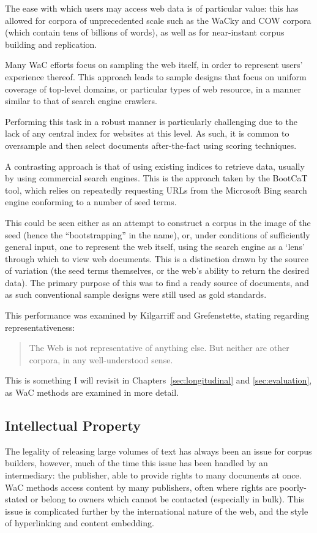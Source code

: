 The ease with which users may access web data is of particular value: this has allowed for corpora of unprecedented scale such as the WaCky\cite{baroni2009wacky} and COW\cite{schafer2012building} corpora (which contain tens of billions of words), as well as for near-instant corpus building and replication.

Many WaC efforts focus on sampling the web itself, in order to represent users' experience thereof.  This approach leads to sample designs that focus on uniform coverage of top-level domains, or particular types of web resource, in a manner similar to that of search engine crawlers.

Performing this task in a robust manner is particularly challenging due to the lack of any central index for websites at this level.  As such, it is common to oversample and then select documents after-the-fact using scoring techniques\cite{schafer2013web,schafer2014focused}.

A contrasting approach is that of using existing indices to retrieve data, usually by using commercial search engines.  This is the approach taken by the BootCaT tool, which relies on repeatedly requesting URLs from the Microsoft Bing search engine conforming to a number of seed terms.

This could be seen either as an attempt to construct a corpus in the image of the seed (hence the ``bootstrapping'' in the name), or, under conditions of sufficiently general input, one to represent the web itself, using the search engine as a `lens' through which to view web documents.  This is a distinction drawn by the source of variation (the seed terms themselves, or the web's ability to return the desired data).  The primary purpose of this was to find a ready source of documents, and as such conventional sample designs were still used as gold standards.

This performance was examined by Kilgarriff and Grefenstette\cite{kilgarriff2003introduction}, stating regarding representativeness:

\begin{quote}
The Web is not representative of anything else. But neither are other corpora, in any
well-understood sense.
\end{quote}

This is something I will revisit in Chapters~\ref{sec:longitudinal} and \ref{sec:evaluation}, as WaC methods are examined in more detail.


\subsection{Intellectual Property}
The legality of releasing large volumes of text has always been an issue for corpus builders, however, much of the time this issue has been handled by an intermediary: the publisher, able to provide rights to many documents at once.  WaC methods access content by many publishers, often where rights are poorly-stated or belong to owners which cannot be contacted (especially in bulk).  This issue is complicated further by the international nature of the web, and the style of hyperlinking and content embedding.  

